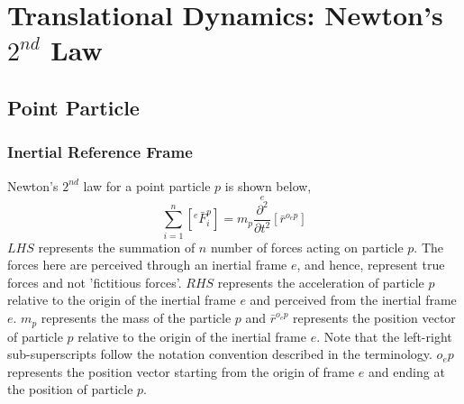 \chapter{Translational Dynamics: Newton's $2^{nd}$ Law}
\begin{comment}
\end{comment}
\section{Point Particle}
\begin{comment}
\end{comment}
\subsection{Inertial Reference Frame}
\begin{comment}
\end{comment}
Newton's $2^{nd}$ law for a point particle $p$ is shown below,
\begin{equation}
\sum^{n}_{i = 1}\left[{}^{e}\bar{F}^{p}_{i}\right] = m_{p}\overset{e}{\frac{\partial^{2}}{\partial t^{2}}}[\bar{r}^{o_{e}p}]
\label{Newtons Second Law}
\end{equation}
$LHS$ represents the summation of $n$ number of forces acting on particle $p$. 
The forces here are perceived through an inertial frame $e$, and hence, represent true forces and not 'fictitious forces'. 
$RHS$ represents the acceleration of particle $p$ relative to the origin of the inertial frame $e$ and perceived from the inertial frame $e$. 
$m_{p}$ represents the mass of the particle $p$ and $\bar{r}^{o_{e}p}$ represents the position vector of particle $p$ relative to the origin of the inertial frame $e$. 
Note that the left-right sub-superscripts follow the notation convention described in the terminology. 
$o_{e}p$ represents the position vector starting from the origin of frame $e$ and ending at the position of particle $p$. 

